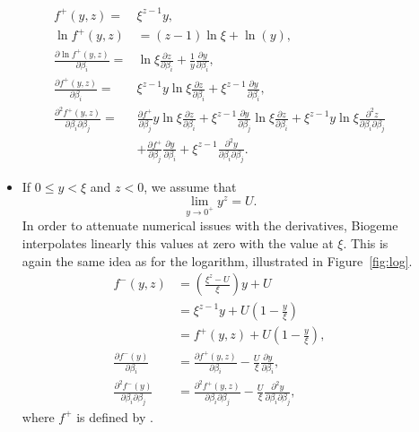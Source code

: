 \documentclass[12pt,a4paper]{article}
\begin{document}
\begin{description}
\begin{itemize}
      \begin{align}
    f^+(y,z)=& \xi^{z-1} y, \label{eq:fplus}\\ 
    \ln f^+(y,z)& = (z-1)\ln\xi+\ln(y), \\
    \frac{\partial \ln f^+(y,z)}{\partial \beta_i} =&
    \ln \xi \frac{\partial z}{\partial \beta_i} +
    \frac{1}{y}\frac{\partial y}{\partial \beta_i}, \nonumber \\
    \frac{\partial f^+(y,z)}{\partial \beta_i} =& \xi^{z-1} y\ln \xi \frac{\partial z}{\partial \beta_i} +
    \xi^{z-1} \frac{\partial y}{\partial \beta_i}, \nonumber\\
    \frac{\partial ^2 f^+(y,z)}{\partial \beta_i \partial \beta_j} =&
    \frac{\partial f^+}{\partial \beta_j} y\ln \xi \frac{\partial z}{\partial \beta_i} +
    \xi^{z-1} \frac{\partial y}{\partial \beta_j}\ln \xi \frac{\partial z}{\partial \beta_i} +
    \xi^{z-1} y\ln \xi \frac{\partial^2 z}{\partial \beta_i \partial \beta_j}\nonumber \\ &+
        \frac{\partial f^+}{\partial \beta_j} \frac{\partial y}{\partial \beta_i} +
        \xi^{z-1} \frac{\partial^2 y}{\partial \beta_i \partial \beta_j}.\nonumber
    \end{align}
    \item If $0 \leq y < \xi$ and $z < 0$, we assume that
  \[
   \lim_{y \to 0^+} y^z = U.
  \]
   In order to attenuate numerical issues with the derivatives, Biogeme interpolates linearly this values at zero with the value at  $\xi$.
This is again the same idea as for the logarithm,  illustrated in Figure~\vref{fig:log}.
      \begin{align*}
        f^-(y, z)& = \left( \frac{\xi^z - U}{\xi} \right) y + U \\&= \xi^{z-1} y + U \left(1 - \frac{y}{\xi}\right) \\
&= f^+(y, z) +  U \left(1 - \frac{y}{\xi}\right),\\ 
        \frac{\partial f^-(y)}{\partial \beta_i} &=
  \frac{\partial f^+(y, z)}{\partial \beta_i} - \frac{U}{\xi} \frac{\partial y}{\partial \beta_i},
        \\
        \frac{\partial^2 f^-(y)}{\partial \beta_i \partial \beta_j} &=
        \frac{\partial^2 f^+(y, z)}{\partial \beta_i \partial \beta_j} - \frac{U}{\xi} \frac{\partial^2 y}{\partial \beta_i \partial \beta_j},
      \end{align*}
      where $f^+$ is defined by .
\end{itemize}
  

\end{description}
\end{document}
